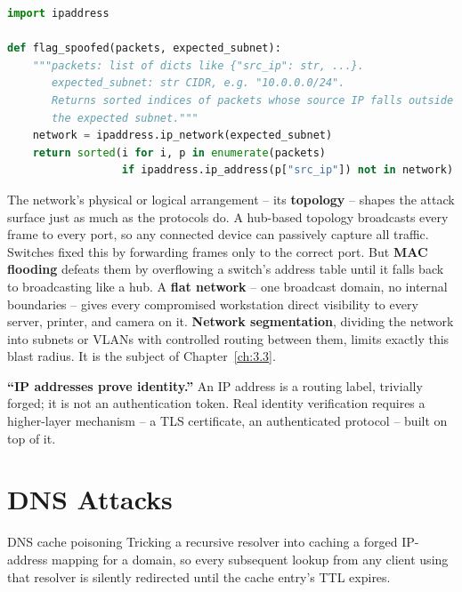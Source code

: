 \begin{lstlisting}[language=Python, caption={Flagging IP-spoofing indicators in a packet log}]
import ipaddress

def flag_spoofed(packets, expected_subnet):
    """packets: list of dicts like {"src_ip": str, ...}.
       expected_subnet: str CIDR, e.g. "10.0.0.0/24".
       Returns sorted indices of packets whose source IP falls outside
       the expected subnet."""
    network = ipaddress.ip_network(expected_subnet)
    return sorted(i for i, p in enumerate(packets)
                  if ipaddress.ip_address(p["src_ip"]) not in network)
\end{lstlisting}

The network's physical or logical arrangement -- its \textbf{topology} -- shapes the attack surface
just as much as the protocols do. A hub-based topology broadcasts every frame to every port, so any
connected device can passively capture all traffic. Switches fixed this by forwarding frames only
to the correct port. But \textbf{MAC flooding} defeats them by overflowing a switch's address
table until it falls back to broadcasting like a hub. A \textbf{flat network} -- one broadcast
domain, no internal boundaries -- gives every compromised workstation direct visibility to every
server, printer, and camera on it. \textbf{Network segmentation}, dividing the network into
subnets or VLANs with controlled routing between them, limits exactly this blast radius. It is the
subject of Chapter~\ref{ch:3.3}.

\begin{misconception}
\textbf{``IP addresses prove identity.''} An IP address is a routing label, trivially forged; it
is not an authentication token. Real identity verification requires a higher-layer mechanism --
a TLS certificate, an authenticated protocol -- built on top of it.
\end{misconception}

\section{DNS Attacks}

\begin{definition}{DNS cache poisoning}
Tricking a recursive resolver into caching a forged IP-address mapping for a domain, so every
subsequent lookup from any client using that resolver is silently redirected until the cache
entry's TTL expires.
\end{definition}

